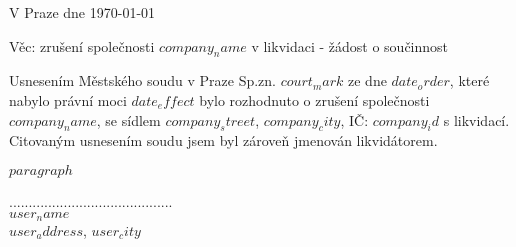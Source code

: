 \documentclass{../static/myletter}
\begin{document}
\begin{letter}{}
\opening{V Praze dne \today}
Věc: zrušení společnosti \textbf{$company_name$} v likvidaci - žádost o součinnost                  

Usnesením Městského soudu v Praze Sp.zn. $court_mark$ ze dne $date_order$, které nabylo právní moci $date_effect$ bylo rozhodnuto o zrušení společnosti $company_name$, se sídlem $company_street$, $company_city$, IČ: \textbf{$company_id$} s likvidací. Citovaným usnesením soudu jsem byl zároveň jmenován likvidátorem.  

$paragraph$

\hspace*{5cm}

\closing{..........................................\\ $user_name$ \\ $user_address$, $user_city$}
\end{letter}
\end{document}
